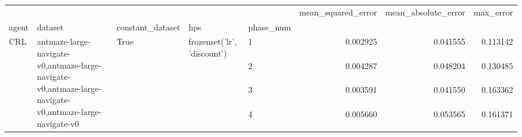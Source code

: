 \begin{tabular}{lllllrrr}
\toprule
 &  &  &  &  & mean_squared_error & mean_absolute_error & max_error \\
agent & dataset & constant_dataset & hps & phase_num &  &  &  \\
\midrule
\multirow[t]{4}{*}{CRL} & \multirow[t]{4}{*}{antmaze-large-navigate-v0,antmaze-large-navigate-v0,antmaze-large-navigate-v0,antmaze-large-navigate-v0} & \multirow[t]{4}{*}{True} & \multirow[t]{4}{*}{frozenset({'lr', 'discount'})} & 1 & 0.002925 & 0.041555 & 0.113142 \\
 &  &  &  & 2 & 0.004287 & 0.048204 & 0.130485 \\
 &  &  &  & 3 & 0.003591 & 0.041550 & 0.163362 \\
 &  &  &  & 4 & 0.005660 & 0.053565 & 0.161371 \\
\cline{1-8} \cline{2-8} \cline{3-8} \cline{4-8}
\bottomrule
\end{tabular}
